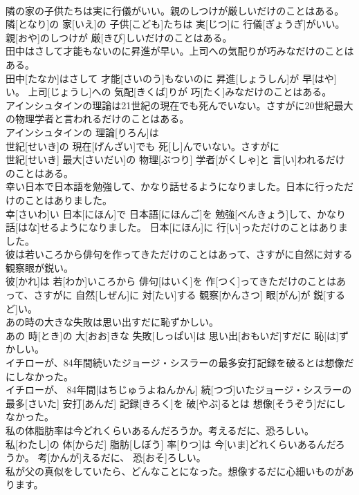 \documentclass[8pt]{extreport}
\begin{document}
\begin{CJK}{UTF8}{min}
\\	隣の家の子供たちは実に行儀がいい。親のしつけが厳しいだけのことはある。	
\\	隣[となり]の 家[いえ]の 子供[こども]たちは 実[じつ]に 行儀[ぎょうぎ]がいい。 親[おや]のしつけが 厳[きび]しいだけのことはある。
\\	田中はさして才能もないのに昇進が早い。上司への気配りが巧みなだけのことはある。	
\\	田中[たなか]はさして 才能[さいのう]もないのに 昇進[しょうしん]が 早[はや]い。 上司[じょうし]への 気配[きくば]りが 巧[たく]みなだけのことはある。
\\	アインシュタインの理論は21世紀の現在でも死んでいない。さすがに20世紀最大の物理学者と言われるだけのことはある。	
\\	アインシュタインの 理論[りろん]は 
\\	世紀[せいき]の 現在[げんざい]でも 死[し]んでいない。さすがに 
\\	世紀[せいき] 最大[さいだい]の 物理[ぶつり] 学者[がくしゃ]と 言[い]われるだけのことはある。
\\	幸い日本で日本語を勉強して、かなり話せるようになりました。日本に行っただけのことはありました。	
\\	幸[さいわ]い 日本[にほん]で 日本語[にほんご]を 勉強[べんきょう]して、かなり 話[はな]せるようになりました。 日本[にほん]に 行[い]っただけのことはありました。
\\	彼は若いころから俳句を作ってきただけのことはあって、さすがに自然に対する観察眼が鋭い。	
\\	彼[かれ]は 若[わか]いころから 俳句[はいく]を 作[つく]ってきただけのことはあって、さすがに 自然[しぜん]に 対[たい]する 観察[かんさつ] 眼[がん]が 鋭[するど]い。
\\	あの時の大きな失敗は思い出すだに恥ずかしい。	
\\	あの 時[とき]の 大[おお]きな 失敗[しっぱい]は 思い出[おもいだ]すだに 恥[は]ずかしい。
\\	イチローが、84年間続いたジョージ・シスラーの最多安打記録を破るとは想像だにしなかった。	
\\	イチローが、 84年間[はちじゅうよねんかん] 続[つづ]いたジョージ・シスラーの 最多[さいた] 安打[あんだ] 記録[きろく]を 破[やぶ]るとは 想像[そうぞう]だにしなかった。
\\	私の体脂肪率は今どれくらいあるんだろうか。考えるだに、恐ろしい。	
\\	私[わたし]の 体[からだ] 脂肪[しぼう] 率[りつ]は 今[いま]どれくらいあるんだろうか。 考[かんが]えるだに、 恐[おそ]ろしい。
\\	私が父の真似をしていたら、どんなことになった。想像するだに心細いものがあります。	

\end{CJK}
\end{document}
